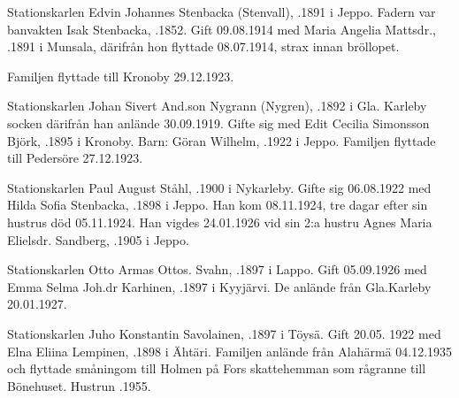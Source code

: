 Stationskarlen Edvin Johannes Stenbacka (Stenvall), .1891 i Jeppo. Fadern var banvakten Isak Stenbacka, .1852. Gift 09.08.1914 med Maria Angelia Mattsdr., .1891 i Munsala, därifrån hon flyttade 08.07.1914, strax innan bröllopet.
\begin{jhchildren}
  \item {}
  \item {}
  \item {}
  \item {}
\end{jhchildren}
Familjen flyttade till Kronoby 29.12.1923.


Stationskarlen Johan Sivert And.son Nygrann (Nygren), .1892 i Gla. Karleby socken därifrån han anlände 30.09.1919. Gifte sig med Edit Cecilia Simonsson Björk, .1895 i Kronoby.
Barn: Göran Wilhelm, .1922 i Jeppo.
Familjen flyttade till Pedersöre 27.12.1923.


Stationskarlen Paul August Ståhl, .1900 i Nykarleby. Gifte sig 06.08.1922 med Hilda Sofia Stenbacka, .1898 i Jeppo. Han kom 08.11.1924, tre dagar efter sin hustrus död 05.11.1924. Han vigdes 24.01.1926 vid sin 2:a hustru Agnes Maria Elielsdr. Sandberg, .1905 i Jeppo.
\begin{jhchildren}
  \item {}
  \item {}
  \item {}
  \item {}
  \item {}
\end{jhchildren}


Stationskarlen Otto Armas Ottos. Svahn, .1897 i Lappo. Gift 05.09.1926 med Emma Selma Joh.dr Karhinen, .1897 i Kyyjärvi. De anlände från Gla.Karleby 20.01.1927.


Stationskarlen Juho Konstantin Savolainen, .1897 i Töysä. Gift 20.05. 1922 med Elna Eliina Lempinen, .1898 i Ähtäri. Familjen anlände från Alahärmä 04.12.1935 och flyttade småningom till Holmen på Fors skattehemman som rågranne till Bönehuset. Hustrun .1955.

